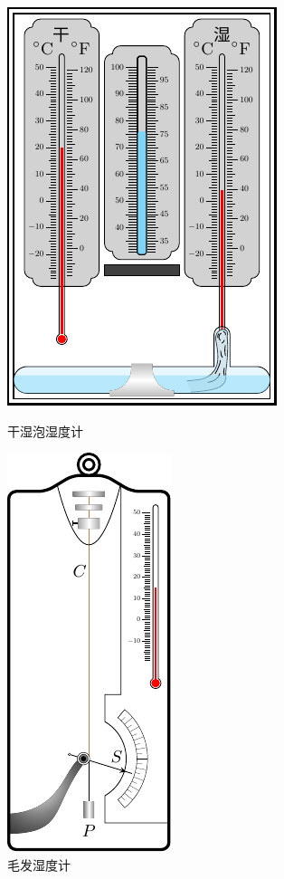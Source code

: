 \begin{figure}[htbp]
	\centering
	\begin{minipage}[t]{0.48\textwidth}
		\centering
		\includegraphics{fig/B/5-10.pdf}
		\caption{干湿泡湿度计}\label{fig_B_5-10}
	\end{minipage}
	\hfil
	\begin{minipage}[t]{0.48\textwidth}
		\centering
		\includegraphics{fig/B/5-11.pdf}
		\caption{毛发湿度计}\label{fig_B_5-11}
	\end{minipage}
\end{figure}




